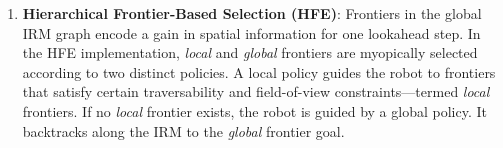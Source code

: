 \documentclass[letterpaper]{article} %
\newcommand{\ph}[1]{{\textbf{#1}:}} %
\begin{document}
\begin{enumerate}
    \item \ph{Hierarchical Frontier-Based Selection (HFE)}
    Frontiers in the global IRM graph encode a gain in spatial information for one lookahead step. In the HFE implementation, \textit{local} and \textit{global} frontiers are myopically selected according to two distinct policies. A local policy guides the robot to frontiers that satisfy certain traversability and field-of-view constraints---termed \textit{local} frontiers. If no \textit{local} frontier exists, the robot is guided by a global policy. It backtracks along the IRM to the \textit{global} frontier goal.
\end{enumerate}




\end{document}
